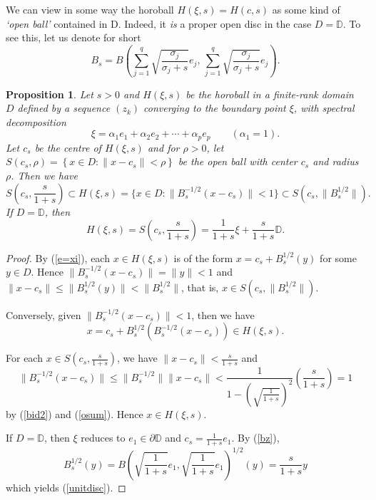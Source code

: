 \documentclass[12pt, twoside]{article}
\newtheorem{proposition}[theorem]{Proposition}
\theoremstyle{definition}
\numberwithin{equation}{section}
\begin{document}
We can view  in some way the horoball $H(\xi,s)=H(c,s)$
 as some kind of  {\it `open ball'} contained in D. Indeed, it {\it is}
a proper open disc in the case $D=\mathbb{D}$.
To see this, let us denote for short
\begin{equation}\label{bberg}
B_s= B\left (\sum_{j=1}^q \sqrt{\frac{\sigma_j}{\sigma_j+s}} e_j, \,\sum_{j=1}^q \sqrt{\frac{\sigma_j}{\sigma_j +s}} e_j
\right).
\end{equation}

\begin{proposition} \label{hbrs}
Let $s>0$ and $H(\xi, s)$ be the horoball in a finite-rank domain $D$ defined by a sequence $(z_k)$
converging to the boundary point $\xi$, with
spectral decomposition $$\xi = \alpha_1 e_1 + \alpha_2 e_2 + \cdots + \alpha_p e_p \qquad (\alpha_1=1).$$
Let $c_s$ be the centre of $H(\xi,s)$ and for $\rho>0$, let
$S\left(c_s, \rho\right)= \left\{x\in D: \|x-c_s\| < \rho \right\}$
be the open ball with center $c_s$ and radius $\rho$.
 Then we have
$$ S\left(c_s, \frac{s}{1+s}\right) \subset H(\xi,s) = \{x\in D: \|B_s^{-1/2}(x-c_s)\| <1\}\subset S(c_s, \|B_s^{1/2}\|).$$
If $D=\mathbb{D}$, then
\begin{equation}\label{unitdisc}
H(\xi,s) = S\left(c_s, \frac{s}{1+s}\right) = \frac{1}{1+s} \xi + \frac{s}{1+s}\mathbb{D}.
\end{equation}
\end{proposition}

\begin{proof}
By (\ref{e=xi}), each $x\in H(\xi,s)$ is of the form $x= c_s + B_s^{1/2}(y)$ for some $y\in D$.
Hence $\|B_s^{-1/2}(x-c_s)\| = \|y\| <1$ and $\|x-c_s\|\leq \|B^{1/2}_s(y)\| <\|B_s^{1/2}\|$, that is,
$x \in  S(c_s, \|B_s^{1/2}\|).$

Conversely, given $\|B_s^{-1/2}(x-c_s)\| <1$, then we have
$$x = c_s + B_s^{1/2}(B_s^{-1/2}(x-c_s)) \in H(\xi,s).$$

For each $x\in S\left(c_s, \frac{s}{1+s}\right)$, we have
$\|x-c_s\| <  \frac{s}{1+s}$ and
$$\|B_s^{-1/2}(x-c_s)\|\leq \|B_s^{-1/2}\| \|x-c_s\| < \frac{1}{1-\left(\sqrt{\frac{1}{1+s}}\right)^2}\left(\frac{s}{1+s}\right) =1$$
by (\ref{bid2}) and (\ref{osum}). Hence $x\in H(\xi,s)$.

If $D=\mathbb{D}$, then $\xi$ reduces to $e_1\in \partial \mathbb{D}$ and $c_s = \frac{1}{1+s}e_1$.
By (\ref{bz}),
$$B_s^{1/2}(y) = B\left(\sqrt{\frac{1}{1+s}} e_1, \sqrt{\frac{1}{1+s}} e_1\right)^{1/2}(y) = \frac{s}{1+s}y$$
which yields (\ref{unitdisc}).

\end{proof}
\end{document}
